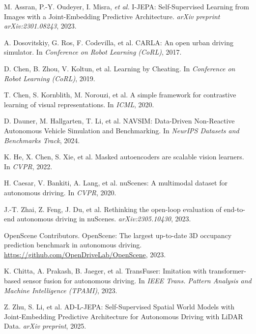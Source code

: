 \documentclass{article}
\begin{document}
\begin{thebibliography}{9}

M. Assran, P.-Y. Oudeyer, I. Misra, \emph{et al.}
\newblock I-JEPA: Self-Supervised Learning from Images with a Joint-Embedding Predictive Architecture.
\newblock \emph{arXiv preprint arXiv:2301.08243}, 2023.

A. Dosovitskiy, G. Ros, F. Codevilla, et al.
\newblock CARLA: An open urban driving simulator.
\newblock In \emph{Conference on Robot Learning (CoRL)}, 2017.

D. Chen, B. Zhou, V. Koltun, et al.
\newblock Learning by Cheating.
\newblock In \emph{Conference on Robot Learning (CoRL)}, 2019.

T. Chen, S. Kornblith, M. Norouzi, et al.
\newblock A simple framework for contrastive learning of visual representations.
\newblock In \emph{ICML}, 2020.

D. Dauner, M. Hallgarten, T. Li, et al.
\newblock NAVSIM: Data-Driven Non-Reactive Autonomous Vehicle Simulation and Benchmarking.
\newblock In \emph{NeurIPS Datasets and Benchmarks Track}, 2024.

K. He, X. Chen, S. Xie, et al.
\newblock Masked autoencoders are scalable vision learners.
\newblock In \emph{CVPR}, 2022.

H. Caesar, V. Bankiti, A. Lang, et al.
\newblock nuScenes: A multimodal dataset for autonomous driving.
\newblock In \emph{CVPR}, 2020.

J.-T. Zhai, Z. Feng, J. Du, et al.
\newblock Rethinking the open-loop evaluation of end-to-end autonomous driving in nuScenes.
\newblock \emph{arXiv:2305.10430}, 2023.

OpenScene Contributors.
\newblock OpenScene: The largest up-to-date 3D occupancy prediction benchmark in autonomous driving.
\newblock \url{https://github.com/OpenDriveLab/OpenScene}, 2023.

K. Chitta, A. Prakash, B. Jaeger, et al.
\newblock TransFuser: Imitation with transformer-based sensor fusion for autonomous driving.
\newblock In \emph{IEEE Trans. Pattern Analysis and Machine Intelligence (TPAMI)}, 2023.

Z. Zhu, S. Li, et al.
\newblock AD-L-JEPA: Self-Supervised Spatial World Models with Joint-Embedding Predictive Architecture for Autonomous Driving with LiDAR Data.
\newblock \emph{arXiv preprint}, 2025.

\end{thebibliography}
\end{document}
